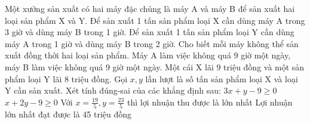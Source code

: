 \begin{ex}
 Một xưởng sản xuất có hai máy đặc chủng là máy A và máy B để sản xuất hai loại sản phẩm X và Y. Để sản xuất 1 tấn sản phẩm loại X cần dùng máy A trong 3 giờ và dùng máy B trong 1 giờ. Để sản xuất 1 tấn sản phẩm loại Y cần dùng máy A trong 1 giờ và dùng máy B trong 2 giờ. Cho biết mỗi máy không thể sản xuất đồng thời hai loại sản phẩm. Máy A làm việc không quá 9 giờ một ngày, máy B làm việc không quá 9 giờ một ngày. Một cái X lãi 9 triệu đồng và một sản phẩm loại Y lãi 8 triệu đồng. Gọi ${x,y}$ lần lượt là số tấn sản phẩm loại X và loại Y cần sản xuất. Xét tính đúng-sai của các khẳng định sau:
\choiceTFt
{ $3 x + y - 9 \ge 0$ }
   { $x + 2 y - 9 \ge 0$ }
     { Với $x = \frac{19}{5}, y = \frac{23}{5}$ thì lợi nhuận thu được là lớn nhất }
    { \True  Lợi nhuận lớn nhất đạt được là 45 triệu đồng }
\end{ex}

